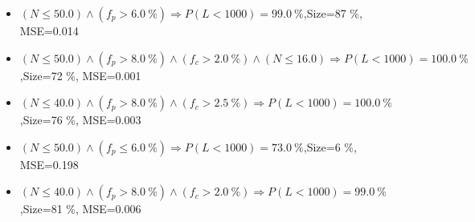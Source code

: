 \documentclass[numbered]{CSL}
\begin{document}
\begin{itemize}
\item $(N \leq 50.0) \land (f_p > 6.0~\%) \Rightarrow P(L < 1 000) = 99.0~\%$,\hfill Size=87 \%, MSE=0.014
\item $(N \leq 50.0) \land (f_p > 8.0~\%) \land (f_c > 2.0~\%) \land (N \leq 16.0) \Rightarrow P(L < 1 000) = 100.0~\%$,\hfill Size=72 \%, MSE=0.001
\item $(N \leq 40.0) \land (f_p > 8.0~\%) \land (f_c > 2.5~\%) \Rightarrow P(L < 1 000) = 100.0~\%$,\hfill Size=76 \%, MSE=0.003
\item $(N \leq 50.0) \land (f_p \leq 6.0~\%) \Rightarrow P(L < 1 000) = 73.0~\%$,\hfill Size=6 \%, MSE=0.198
\item $(N \leq 40.0) \land (f_p > 8.0~\%) \land (f_c > 2.0~\%) \Rightarrow P(L < 1 000) = 99.0~\%$,\hfill Size=81 \%, MSE=0.006
\end{itemize}
\end{document}
